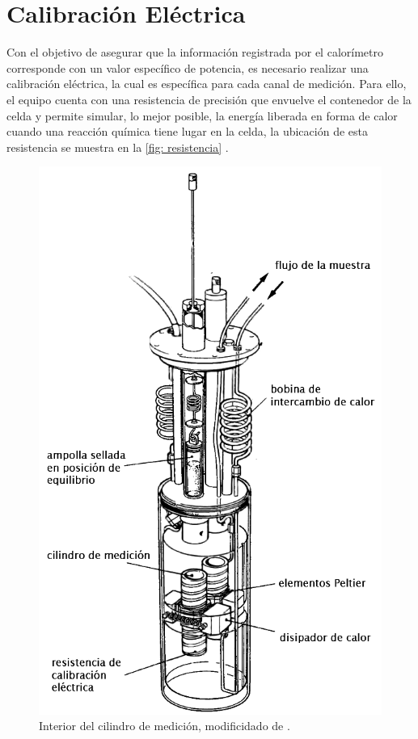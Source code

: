 
%




\chapter{Calibración Eléctrica}
	Con el objetivo de asegurar que la información registrada por el calorímetro corresponde con un valor específico de potencia, es necesario realizar una calibración eléctrica, la cual es específica para cada canal de medición. Para ello, el equipo cuenta con una resistencia de precisión que envuelve el contenedor de la celda y permite simular, lo mejor posible, la energía liberada en forma de calor cuando una reacción química tiene lugar en la celda, la ubicación de esta resistencia se muestra en la \autoref{fig: resistencia} \cite{Suurkuusk}. 
	\begin{figure}[h]
		\centering
		\includegraphics[width=0.45\linewidth]{Figures/resistencia}
		\caption{Interior del cilindro de medición, modificidado de \cite{Suurkuusk}.}
		\label{fig: resistencia}
	\end{figure}
	
